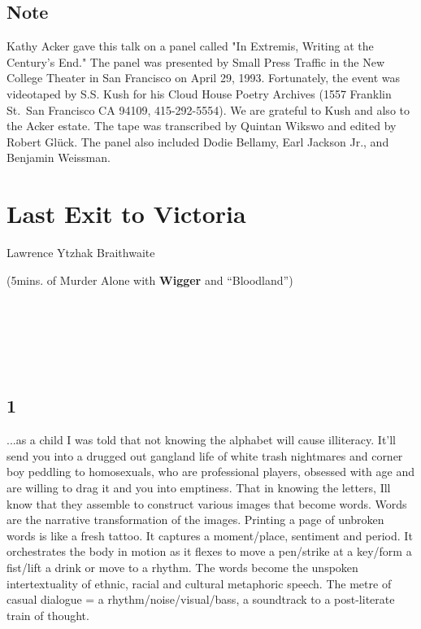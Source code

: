 \hypertarget{note}{%
\subsection{Note}\label{note}}

Kathy Acker gave this talk on a panel called "In Extremis, Writing at
the Century's End." The panel was presented by Small Press Traffic in
the New College Theater in San Francisco on April 29, 1993. Fortunately,
the event was videotaped by S.S. Kush for his Cloud House Poetry
Archives (1557 Franklin St.~San Francisco CA 94109, 415-292-5554). We
are grateful to Kush and also to the Acker estate. The tape was
transcribed by Quintan Wikswo and edited by Robert Glück. The panel also
included Dodie Bellamy, Earl Jackson Jr., and Benjamin Weissman.

\hypertarget{last-exit-to-victoria}{%
\section{Last Exit to Victoria}\label{last-exit-to-victoria}}

Lawrence Ytzhak Braithwaite

(5mins. of Murder Alone with \textbf{Wigger} and ``Bloodland'')

~

~

~

\hypertarget{section}{%
\subsection{1}\label{section}}

...as a child I was told that not knowing the alphabet will cause
illiteracy. It'll send you into a drugged out gangland life of white
trash nightmares and corner boy peddling to homosexuals, who are
professional players, obsessed with age and are willing to drag it and
you into emptiness. That in knowing the letters, Ill know that they
assemble to construct various images that become words. Words are the
narrative transformation of the images. Printing a page of unbroken
words is like a fresh tattoo. It captures a moment/place, sentiment and
period. It orchestrates the body in motion as it flexes to move a
pen/strike at a key/form a fist/lift a drink or move to a rhythm. The
words become the unspoken intertextuality of ethnic, racial and cultural
metaphoric speech. The metre of casual dialogue = a
rhythm/noise/visual/bass, a soundtrack to a post-literate train of
thought.

